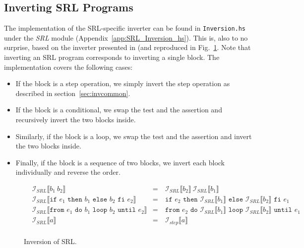 \subsection{Inverting SRL Programs}

The implementation of the SRL-specific inverter can be found in \texttt{Inversion.hs} under the \textit{SRL} module (Appendix~\ref{app:SRL_Inversion_hs}). This is, also to no surprise, based on the inverter presented in \cite[Fig.~18]{REV} (and reproduced in Fig.~\ref{fig:inversion_srl}. Note that inverting an SRL program corresponds to inverting a single block. The implementation covers the following cases:

\begin{itemize}
  \item If the block is a step operation, we simply invert the step operation as described in section~\ref{sec:invcommon}.

  \item If the block is a conditional, we swap the test and the assertion and recursively invert the two blocks inside.

  \item Similarly, if the block is a loop, we swap the test and the assertion and invert the two blocks inside.

  \item Finally, if the block is a sequence of two blocks, we invert each block individually and reverse the order.
\end{itemize}

\begin{figure}
  $$\begin{aligned}
    & \mathcal{I}_{SRL}\llbracket b_1\ b_2\rrbracket & =\ & \mathcal{I}_{SRL}\llbracket b_2\rrbracket\ \mathcal{I}_{SRL}\llbracket b_1\rrbracket\\
    & \mathcal{I}_{SRL}\llbracket\texttt{if }e_1\texttt{ then }b_1\texttt{ else }b_2\texttt{ fi }e_2\rrbracket & =\ &
      \texttt{if }e_2\texttt{ then }\mathcal{I}_{SRL}\llbracket b_1\rrbracket\texttt{ else }\mathcal{I}_{SRL}\llbracket b_2\rrbracket\texttt{ fi }e_1\\
    & \mathcal{I}_{SRL}\llbracket\texttt{from }e_1\texttt{ do }b_1\texttt{ loop }b_2\texttt{ until }e_2\rrbracket & =\ &
      \texttt{from }e_2\texttt{ do }\mathcal{I}_{SRL}\llbracket b_1\rrbracket\texttt{ loop }\mathcal{I}_{SRL}\llbracket b_2\rrbracket\texttt{ until }e_1\\
    & \mathcal{I}_{SRL}\llbracket a\rrbracket & =\ & \mathcal{I}_{step}\llbracket a\rrbracket\\
  \end{aligned}$$
  \caption{Inversion of SRL.}
  \label{fig:inversion_srl}
\end{figure}
